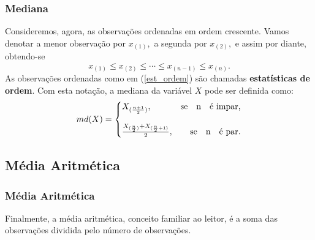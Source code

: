\documentclass[14pt,aspectratio=1610]{beamer}
\begin{document}
\begin{frame}{}
\frametitle{Mediana}
\begin{block}{}
	\small
\justifying
Consideremos, agora, as observações ordenadas em ordem crescente. Vamos denotar a
menor observação por $x_{(1)},$ a segunda por $x_{(2)},$ e assim por diante, obtendo-se
\begin{equation}\label{est_ordem}
x_{(1)}\leq x_{(2)}\leq \cdots \leq x_{(n-1)}\leq x_{(n)}.
\end{equation}
As observações ordenadas como em (\ref{est_ordem}) são chamadas {\bf estatísticas de ordem}. Com esta notação, a mediana da variável $X$ pode ser definida como:
\[
md(X)=\left\{
\setlength\arraycolsep{0pt}
\begin{array}{lr}
X_{(\frac{n+1}{2})},                                             &\quad \textrm{se}\quad $n$\quad \textrm{é impar,}\\
&\\
\frac{X_{(\frac{n}{2})}+X_{(\frac{n}{2}+1)}}{2},  &\quad \textrm{se}\quad $n$\quad \textrm{é par.}\\
\end{array}
\right.
\]
\end{block}
\end{frame}
\subsection{Média Aritmética}
\begin{frame}{}
\frametitle{Média Aritmética}
\begin{block}{}
\justifying
Finalmente, a média aritmética, conceito familiar ao leitor, é a soma das observações dividida pelo número de observações.
\end{block}
\end{frame}

\end{document}
